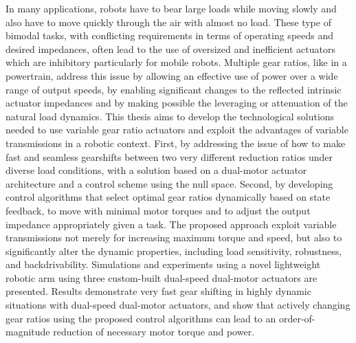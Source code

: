 In many applications, robots have to bear large loads while moving slowly and also have to move quickly through the air with almost no load. These type of bimodal tasks, with conflicting requirements in terms of operating speeds and desired impedances, often lead to the use of oversized and inefficient actuators which are inhibitory particularly for mobile robots. Multiple gear ratios, like in a powertrain, address this issue by allowing an effective use of power over a wide range of output speeds, by enabling significant changes to the reflected intrinsic actuator impedances and by making possible the leveraging or attenuation of the natural load dynamics. This thesis aims to develop the technological solutions needed to use variable gear ratio actuators and exploit the advantages of variable transmissions in a robotic context. First, by addressing the issue of how to make fast and seamless gearshifts between two very different reduction ratios under diverse load conditions, with a solution based on a dual-motor actuator architecture and a control scheme using the null space. Second, by developing control algorithms that select optimal gear ratios dynamically based on state feedback, to move with minimal motor torques and to adjust the output impedance appropriately given a task. The proposed approach exploit variable transmissions not merely for increasing maximum torque and speed, but also to significantly alter the dynamic properties, including load sensitivity, robustness, and backdrivability. Simulations and experiments using a novel lightweight robotic arm using three custom-built dual-speed dual-motor actuators are presented. Results demonstrate very fast gear shifting in highly dynamic situations with dual-speed dual-motor actuators, and show that actively changing gear ratios using the proposed control algorithms can lead to an order-of-magnitude reduction of necessary motor torque and power.
